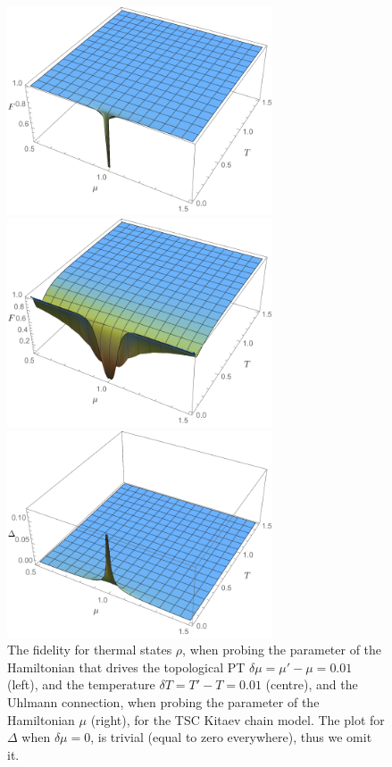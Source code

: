  \begin{figure}[h!]
\begin{minipage}{0.33\textwidth}
\includegraphics[width=0.7\textwidth,height=0.5\textwidth]{kitaev_fidelity_theta.pdf}
\end{minipage}%
\begin{minipage}{0.33\textwidth}
\includegraphics[width=0.7\textwidth,height=0.5\textwidth]{kitaev_fidelity_T.pdf}
\end{minipage}
\begin{minipage}{0.33\textwidth}
\includegraphics[width=0.7\textwidth,height=0.5\textwidth]{kitaev_uhlmann_theta.pdf}
\end{minipage}%
\caption{The fidelity for thermal states $\rho$, when probing the parameter of the Hamiltonian that drives the topological PT $\delta \mu =\mu'-\mu=0.01$ (left), and the temperature $\delta T=T'-T=0.01$ (centre), and the Uhlmann connection, when probing the parameter of the Hamiltonian $\mu$ (right), for the TSC Kitaev chain model. The plot for $\Delta$ when $\delta \mu=0$, is trivial (equal to zero everywhere), thus we omit it.}
\label{fig:fid:kit}
\end{figure}

